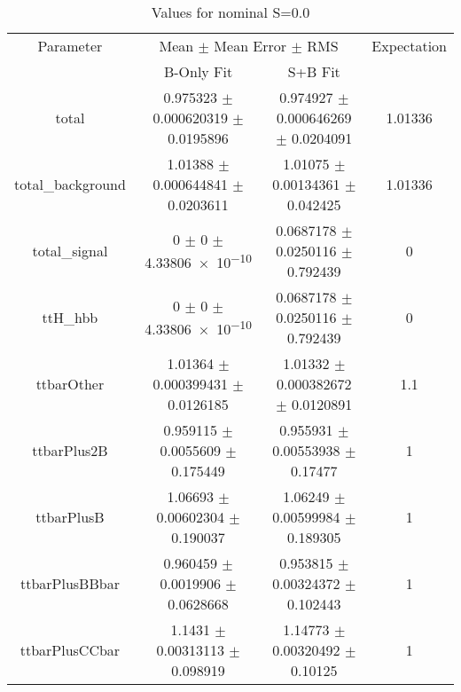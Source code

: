 \begin{table}
\centering
\caption{Values for nominal S=0.0}
\begin{tabular}{cccc}
\toprule
Parameter & \multicolumn{2}{c}{Mean $\pm$ Mean Error $\pm$ RMS} & Expectation\\
 & B-Only Fit & S+B Fit & \\
\midrule
total & \num{0.975323} $\pm$ \num{0.000620319} $\pm$ \num{0.0195896} & \num{0.974927} $\pm$ \num{0.000646269} $\pm$ \num{0.0204091} & \num{1.01336}\\
total\_background & \num{1.01388} $\pm$ \num{0.000644841} $\pm$ \num{0.0203611} & \num{1.01075} $\pm$ \num{0.00134361} $\pm$ \num{0.042425} & \num{1.01336}\\
total\_signal & \num{0} $\pm$ \num{0} $\pm$ \num{4.33806e-10} & \num{0.0687178} $\pm$ \num{0.0250116} $\pm$ \num{0.792439} & \num{0}\\
ttH\_hbb & \num{0} $\pm$ \num{0} $\pm$ \num{4.33806e-10} & \num{0.0687178} $\pm$ \num{0.0250116} $\pm$ \num{0.792439} & \num{0}\\
ttbarOther & \num{1.01364} $\pm$ \num{0.000399431} $\pm$ \num{0.0126185} & \num{1.01332} $\pm$ \num{0.000382672} $\pm$ \num{0.0120891} & \num{1.1}\\
ttbarPlus2B & \num{0.959115} $\pm$ \num{0.0055609} $\pm$ \num{0.175449} & \num{0.955931} $\pm$ \num{0.00553938} $\pm$ \num{0.17477} & \num{1}\\
ttbarPlusB & \num{1.06693} $\pm$ \num{0.00602304} $\pm$ \num{0.190037} & \num{1.06249} $\pm$ \num{0.00599984} $\pm$ \num{0.189305} & \num{1}\\
ttbarPlusBBbar & \num{0.960459} $\pm$ \num{0.0019906} $\pm$ \num{0.0628668} & \num{0.953815} $\pm$ \num{0.00324372} $\pm$ \num{0.102443} & \num{1}\\
ttbarPlusCCbar & \num{1.1431} $\pm$ \num{0.00313113} $\pm$ \num{0.098919} & \num{1.14773} $\pm$ \num{0.00320492} $\pm$ \num{0.10125} & \num{1}\\
\bottomrule
\end{tabular}
\end{table}